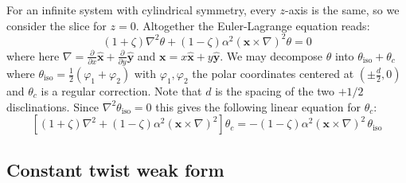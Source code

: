 \documentclass[reqno]{article}
\begin{document}
For an infinite system with cylindrical symmetry, every $z$-axis is the same, so we consider the slice for $z = 0$.
Altogether the Euler-Lagrange equation reads:
\begin{equation}
    \left(1 + \zeta \right) \nabla^2 \theta
    +
    \left(1 - \zeta \right) \alpha^2 \left(
        \mathbf{x} \times \nabla
    \right)^2 \theta
    =
    0
\end{equation}
where here $\nabla = \frac{\partial}{\partial x} \hat{\mathbf{x}} + \frac{\partial}{\partial y} \hat{\mathbf{y}}$ and $\mathbf{x} = x \hat{\mathbf{x}} + y \hat{\mathbf{y}}$.
We may decompose $\theta$ into $\theta_\text{iso} + \theta_c$ where $\theta_\text{iso} = \frac12 \left(\varphi_1 + \varphi_2\right)$ with $\varphi_1, \varphi_2$ the polar coordinates centered at $\left(\pm \frac{d}{2}, 0\right)$ and $\theta_c$ is a regular correction.
Note that $d$ is the spacing of the two $+1/2$ disclinations. 
Since $\nabla^2 \theta_\text{iso} = 0$ this gives the following linear equation for $\theta_c$:
\begin{equation} \label{eq:constant-twist-euler-lagrange}
    \left[
        (1 + \zeta) \nabla^2 
        + (1 - \zeta) \alpha^2 \left(\mathbf{x} \times \nabla\right)^2
    \right] \theta_c
    =
    -(1 - \zeta) \alpha^2 \left(\mathbf{x} \times \nabla \right)^2 \, \theta_\text{iso}
\end{equation}

\subsection{Constant twist weak form}
\end{document}
